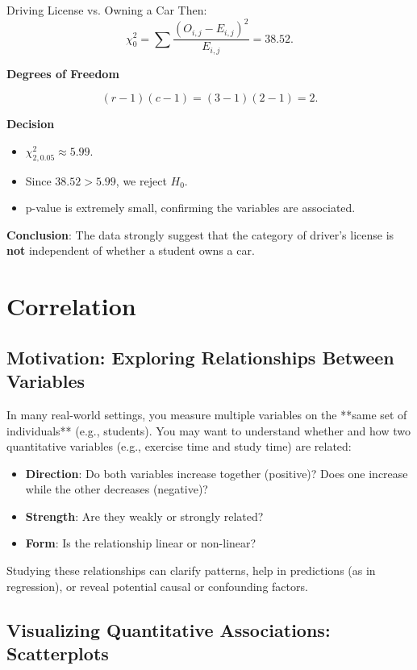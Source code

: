 \documentclass[10pt]{extarticle}
\begin{document}
\begin{examplebox}{Driving License vs. Owning a Car}{}
    Then:
    \[
        \chi^2_0
        = \sum \frac{(O_{i,j} - E_{i,j})^2}{E_{i,j}}
        = 38.52.
    \]

    \textbf{Degrees of Freedom}

    \[
        (r - 1)(c - 1) = (3 - 1)(2 - 1) = 2.
    \]

    \textbf{Decision}

    \begin{itemize}
        \item $\chi^2_{2,0.05}\approx 5.99$.
        \item Since $38.52 > 5.99$, we reject $H_0$.
        \item p-value is extremely small, confirming the variables are associated.
    \end{itemize}

    \textbf{Conclusion}: The data strongly suggest that the category of driver's license is \textbf{not} independent of whether a student owns a car.
\end{examplebox}

\pagebreak
\section{Correlation}
\subsection{Motivation: Exploring Relationships Between Variables}

In many real-world settings, you measure multiple variables on the **same set of individuals** (e.g., students). You may want to understand whether and how two quantitative variables (e.g., exercise time and study time) are related:
\begin{itemize}
    \item \textbf{Direction}: Do both variables increase together (positive)? Does one increase while the other decreases (negative)?
    \item \textbf{Strength}: Are they weakly or strongly related?
    \item \textbf{Form}: Is the relationship linear or non-linear?
\end{itemize}

Studying these relationships can clarify patterns, help in predictions (as in regression), or reveal potential causal or confounding factors.



\subsection{Visualizing Quantitative Associations: Scatterplots}
\end{document}
